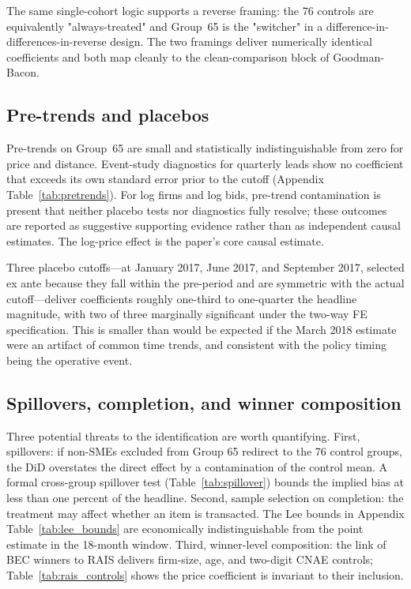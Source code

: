 

The same single-cohort logic supports a reverse framing: the 76 controls are equivalently "always-treated" and Group~65 is the "switcher" in a \citet{kim2019} difference-in-differences-in-reverse design. The two framings deliver numerically identical coefficients and both map cleanly to the clean-comparison block of Goodman-Bacon.

\subsection{Pre-trends and placebos}

Pre-trends on Group~65 are small and statistically indistinguishable from zero for price and distance. Event-study diagnostics for quarterly leads show no coefficient that exceeds its own standard error prior to the cutoff (Appendix Table~\ref{tab:pretrends}). For log firms and log bids, pre-trend contamination is present that neither placebo tests nor \citet{sun2021} diagnostics fully resolve; these outcomes are reported as suggestive supporting evidence rather than as independent causal estimates. The log-price effect is the paper's core causal estimate.

Three placebo cutoffs---at January 2017, June 2017, and September 2017, selected ex ante because they fall within the pre-period and are symmetric with the actual cutoff---deliver coefficients roughly one-third to one-quarter the headline magnitude, with two of three marginally significant under the two-way FE specification. This is smaller than would be expected if the March 2018 estimate were an artifact of common time trends, and consistent with the policy timing being the operative event.



\subsection{Spillovers, completion, and winner composition}

Three potential threats to the identification are worth quantifying. First, spillovers: if non-SMEs excluded from Group 65 redirect to the 76 control groups, the DiD overstates the direct effect by a contamination of the control mean. A formal cross-group spillover test (Table~\ref{tab:spillover}) bounds the implied bias at less than one percent of the headline. Second, sample selection on completion: the treatment may affect whether an item is transacted. The Lee bounds in Appendix Table~\ref{tab:lee_bounds} are economically indistinguishable from the point estimate in the 18-month window. Third, winner-level composition: the link of BEC winners to RAIS delivers firm-size, age, and two-digit CNAE controls; Table~\ref{tab:rais_controls} shows the price coefficient is invariant to their inclusion.


